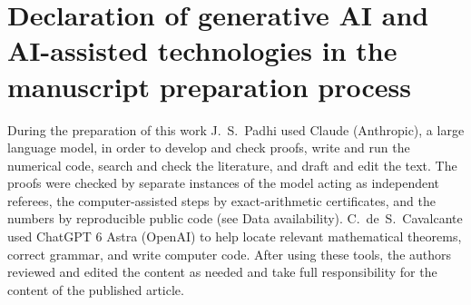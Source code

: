 \documentclass[5p,times]{elsarticle}
\theoremstyle{definition}
\begin{document}
\section*{Declaration of generative AI and AI-assisted technologies in the manuscript preparation process}
During the preparation of this work J.~S.~Padhi used Claude (Anthropic), a large language model, in order to develop and check proofs, write and run the numerical code, search and check the literature, and draft and edit the text. The proofs were checked by separate instances of the model acting as independent referees, the computer-assisted steps by exact-arithmetic certificates, and the numbers by reproducible public code (see Data availability). C.~de~S.~Cavalcante used ChatGPT 6 Astra (OpenAI) to help locate relevant mathematical theorems, correct grammar, and write computer code. After using these tools, the authors reviewed and edited the content as needed and take full responsibility for the content of the published article.

{\small


}
\end{document}
